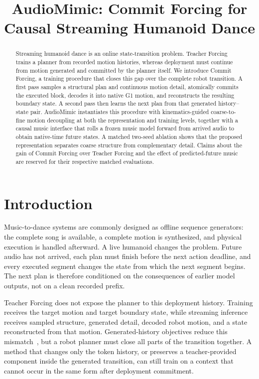 \documentclass[conference]{IEEEtran}
\title{AudioMimic: Commit Forcing for Causal Streaming Humanoid Dance}
\newcommand{\method}{AudioMimic}
\newcommand{\cof}{Commit Forcing}
\begin{document}
\maketitle

\begin{abstract}
Streaming humanoid dance is an online state-transition problem. Teacher Forcing trains a planner from recorded motion histories, whereas deployment must continue from motion generated and committed by the planner itself. We introduce \cof{}, a training procedure that closes this gap over the complete robot transition. A first pass samples a structural plan and continuous motion detail, atomically commits the executed block, decodes it into native G1 motion, and reconstructs the resulting boundary state. A second pass then learns the next plan from that generated history--state pair. \method{} instantiates this procedure with kinematics-guided coarse-to-fine motion decoupling at both the representation and training levels, together with a causal music interface that rolls a frozen music model forward from arrived audio to obtain native-time future states. A matched two-seed ablation shows that the proposed representation separates coarse structure from complementary detail. Claims about the gain of \cof{} over Teacher Forcing and the effect of predicted-future music are reserved for their respective matched evaluations.
\end{abstract}

\section{Introduction}
Music-to-dance systems are commonly designed as offline sequence generators: the complete song is available, a complete motion is synthesized, and physical execution is handled afterward. A live humanoid changes the problem. Future audio has not arrived, each plan must finish before the next action deadline, and every executed segment changes the state from which the next segment begins. The next plan is therefore conditioned on the consequences of earlier model outputs, not on a clean recorded prefix.

Teacher Forcing does not expose the planner to this deployment history. Training receives the target motion and target boundary state, while streaming inference receives sampled structure, generated detail, decoded robot motion, and a state reconstructed from that motion. Generated-history objectives reduce this mismatch~\cite{bengio2015scheduled,lamb2016professor,chen2024diffusionforcing}, but a robot planner must close all parts of the transition together. A method that changes only the token history, or preserves a teacher-provided component inside the generated transition, can still train on a context that cannot occur in the same form after deployment commitment.
\end{document}
